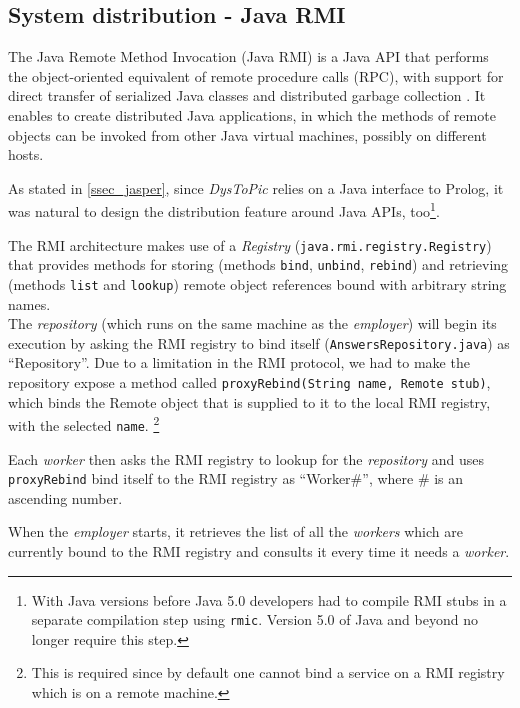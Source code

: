 \documentclass[a4paper, 11pt, oneside]{duthesis}
\begin{document}

\subsection{System distribution - Java RMI}


The Java Remote Method Invocation (Java RMI) is a Java API that performs the object-oriented equivalent of remote procedure calls (RPC), with support for direct transfer of serialized Java classes and distributed garbage collection \cite{wiki_rmi}.
It enables to create distributed Java applications, in which the methods of remote objects can be invoked from other Java virtual machines, possibly on different hosts\cite{oracle_rmi}.

As stated in \ref{ssec_jasper}, since \emph{DysToPic} relies on a Java interface to Prolog, it was natural to design the distribution feature around Java APIs, too\footnote{With Java versions before Java 5.0 developers had to compile RMI stubs in a separate compilation step using \texttt{rmic}. Version 5.0 of Java and beyond no longer require this step.}.

The RMI architecture makes use of a \emph{Registry} (\verb$java.rmi.registry.Registry$) that provides methods for storing (methods \texttt{bind}, \texttt{unbind}, \texttt{rebind}) and retrieving (methods \texttt{list} and \texttt{lookup}) remote object references bound with arbitrary string names.\\

The \emph{repository} (which runs on the same machine as the \emph{employer}) will begin its execution by asking the RMI registry to bind itself (\verb$AnswersRepository.java$) as ``Repository''.
Due to a limitation in the RMI protocol, we had to make the repository expose a method called \texttt{proxyRebind(String name, Remote stub)}, which binds the Remote object that is supplied to it to the local RMI registry, with the selected \texttt{name}.
\footnote{This is required since by default one cannot bind a service on a RMI registry which is on a remote machine.}

Each \emph{worker} then asks the RMI registry to lookup for the \emph{repository} and uses \texttt{proxyRebind} bind itself to the RMI registry as ``Worker\#'', where \# is an ascending number.

When the \emph{employer} starts, it retrieves the list of all the \emph{workers} which are currently bound to the RMI registry and consults it every time it needs a \emph{worker}.
\end{document}
